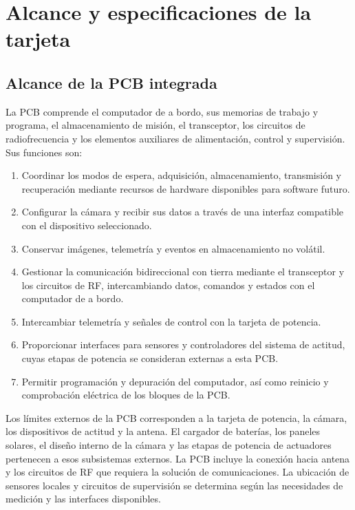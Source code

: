 \documentclass[11pt,letterpaper]{article}
\begin{document}
\section{Alcance y especificaciones de la tarjeta}
\label{sec:punto1}

\subsection{Alcance de la PCB integrada}
La PCB comprende el computador de a bordo, sus memorias de trabajo y programa, el almacenamiento de misión, el transceptor, los circuitos de radiofrecuencia y los elementos auxiliares de alimentación, control y supervisión. Sus funciones son:
\begin{enumerate}[label=\arabic*.]
\item Coordinar los modos de espera, adquisición, almacenamiento, transmisión y recuperación mediante recursos de hardware disponibles para software futuro.
\item Configurar la cámara y recibir sus datos a través de una interfaz compatible con el dispositivo seleccionado.
\item Conservar imágenes, telemetría y eventos en almacenamiento no volátil.
\item Gestionar la comunicación bidireccional con tierra mediante el transceptor y los circuitos de RF, intercambiando datos, comandos y estados con el computador de a bordo.
\item Intercambiar telemetría y señales de control con la tarjeta de potencia.
\item Proporcionar interfaces para sensores y controladores del sistema de actitud, cuyas etapas de potencia se consideran externas a esta PCB.
\item Permitir programación y depuración del computador, así como reinicio y comprobación eléctrica de los bloques de la PCB.
\end{enumerate}

Los límites externos de la PCB corresponden a la tarjeta de potencia, la cámara, los dispositivos de actitud y la antena. El cargador de baterías, los paneles solares, el diseño interno de la cámara y las etapas de potencia de actuadores pertenecen a esos subsistemas externos. La PCB incluye la conexión hacia antena y los circuitos de RF que requiera la solución de comunicaciones. La ubicación de sensores locales y circuitos de supervisión se determina según las necesidades de medición y las interfaces disponibles.
\end{document}

